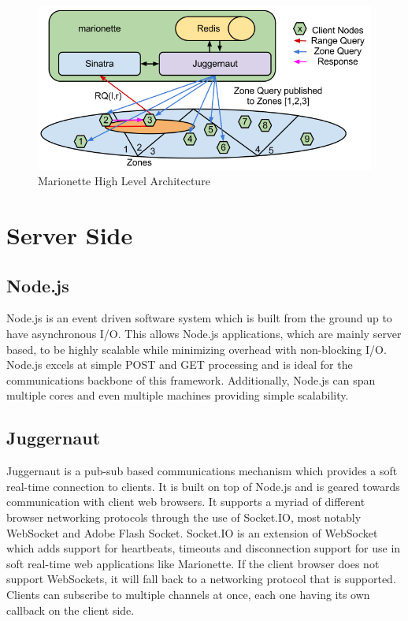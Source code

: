 \documentclass[12pt]{report}	%
\theoremstyle{definition}
\theoremstyle{remark}
\begin{document}
\begin{figure}[h!]
\centering
\includegraphics[scale=0.6]{0.png}
\caption{Marionette High Level Architecture}
\label{hla}
\end{figure}

\section{Server Side}

\subsection{Node.js}

Node.js is an event driven software system which is built from the
ground up to have asynchronous I/O. This allows Node.js applications,
which are mainly server based, to be highly scalable while minimizing
overhead with non-blocking I/O. Node.js excels at simple POST and GET
processing and is ideal for the communications backbone of this
framework. Additionally, Node.js can span multiple cores and even
multiple machines providing simple scalability.

\subsection{Juggernaut}

Juggernaut is a pub-sub based communications mechanism which provides a
soft real-time connection to clients. It is built on top of Node.js and
is geared towards communication with client web browsers. It supports a
myriad of different browser networking protocols through the use of
Socket.IO, most notably WebSocket and Adobe Flash Socket. Socket.IO is
an extension of WebSocket which adds support for heartbeats, timeouts
and disconnection support for use in soft real-time web applications
like Marionette. If the client browser does not support WebSockets, it
will fall back to a networking protocol that is supported. Clients can
subscribe to multiple channels at once, each one having its own callback
on the client side.
\end{document}
